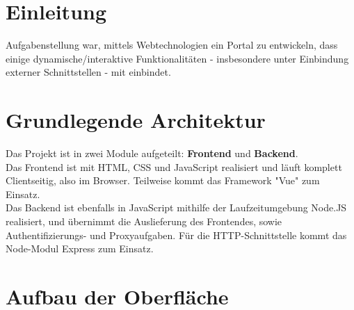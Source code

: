 \documentclass[fleqn,10pt]{SelfArx} %
\affiliation{\textsuperscript{1}\textit{Studiengang Informationstechnik, Fakultät Technik, Duale Schule Baden-Württemberg, Stuttgart}} %
\begin{document}
\flushbottom %

\maketitle %

\tableofcontents %

\thispagestyle{empty} %


\section*{Einleitung} %

Aufgabenstellung war, mittels Webtechnologien ein Portal zu entwickeln, dass einige dynamische/interaktive Funktionalitäten - insbesondere unter Einbindung externer Schnittstellen - mit einbindet. 

\section{Grundlegende Architektur}
Das Projekt ist in zwei Module aufgeteilt: \textbf{Frontend} und \textbf{Backend}. \\ Das Frontend ist mit HTML, CSS und JavaScript realisiert und läuft komplett Clientseitig, also im Browser. Teilweise kommt das Framework "Vue" zum Einsatz. \\ Das Backend ist ebenfalls in JavaScript mithilfe der Laufzeitumgebung Node.JS realisiert, und übernimmt die Auslieferung des Frontendes, sowie Authentifizierungs- und Proxyaufgaben. Für die HTTP-Schnittstelle kommt das Node-Modul Express zum Einsatz.
\section{Aufbau der Oberfläche}
\end{document}
